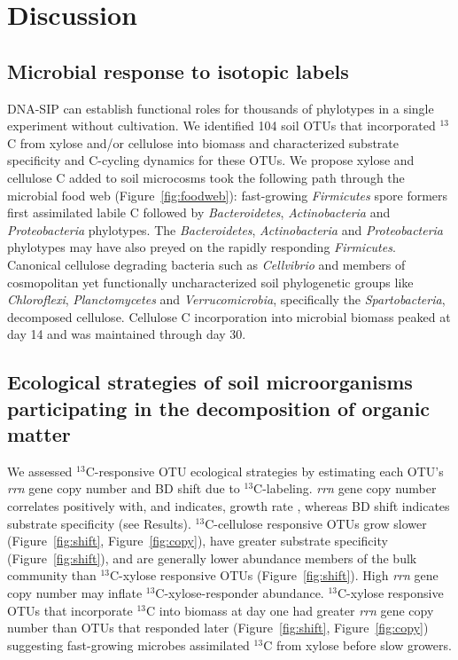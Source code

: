 \section{Discussion} 
\subsection{Microbial response to isotopic labels}
DNA-SIP can establish functional roles for thousands of phylotypes in a single
experiment without cultivation. We identified 104 soil OTUs that
incorporated $^{13}$C from xylose and/or cellulose into biomass and
characterized substrate specificity and C-cycling dynamics for these OTUs. We
propose xylose and cellulose C added to soil microcosms took the following path
through the microbial food web (Figure~\ref{fig:foodweb}): fast-growing
\textit{Firmicutes} spore formers first assimilated labile C followed by
\textit{Bacteroidetes}, \textit{Actinobacteria} and \textit{Proteobacteria}
phylotypes. The \textit{Bacteroidetes}, \textit{Actinobacteria} and
\textit{Proteobacteria} phylotypes may have also preyed on the rapidly
responding \textit{Firmicutes}. Canonical cellulose degrading bacteria such as
\textit{Cellvibrio} and members of cosmopolitan yet functionally
uncharacterized soil phylogenetic groups like \textit{Chloroflexi},
\textit{Planctomycetes} and \textit{Verrucomicrobia}, specifically the
\textit{Spartobacteria}, decomposed cellulose. Cellulose C incorporation into
microbial biomass peaked at day 14 and was maintained through day 30.

\subsection{Ecological strategies of soil microorganisms participating in the
decomposition of organic matter}
We assessed $^{13}$C-responsive OTU ecological strategies by estimating each
OTU's \textit{rrn} gene copy number and BD shift due to $^{13}$C-labeling.
\textit{rrn} gene copy number correlates positively with, and indicates, growth
rate \citep{11125085,Kembel_2012}, whereas BD shift indicates substrate
specificity (see Results). $^{13}$C-cellulose responsive OTUs grow slower
(Figure~\ref{fig:shift}, Figure~\ref{fig:copy}), have greater substrate
specificity (Figure~\ref{fig:shift}), and are generally lower abundance members
of the bulk community than $^{13}$C-xylose responsive OTUs
(Figure~\ref{fig:shift}). High \textit{rrn} gene copy number may inflate
$^{13}$C-xylose-responder abundance. $^{13}$C-xylose responsive OTUs that
incorporate $^{13}$C into biomass at day one had greater \textit{rrn} gene copy
number than OTUs that responded later (Figure~\ref{fig:shift},
Figure~\ref{fig:copy}) suggesting fast-growing
microbes assimilated $^{13}$C from xylose before slow growers.


